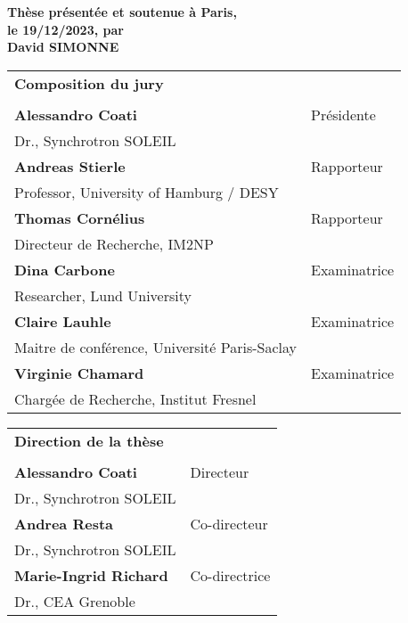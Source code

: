 \begin{titlepage}
\textbf{Thèse présentée et soutenue à Paris,\\ le 19/12/2023, par}\\
\bigskip
\Large {\color{Prune} \textbf{David SIMONNE}}

\vspace{\fill} %

\bigskip
\flushleft
\scriptsize
\begin{tabular}{|p{7cm}l}
\arrayrulecolor{Prune}
{\footnotesize \textbf{Composition du jury}}\\
& \\
\textbf{Alessandro Coati} & Présidente \\
Dr., Synchrotron SOLEIL & \\
\textbf{Andreas Stierle} & Rapporteur \\
Professor, University of Hamburg / DESY & \\
\textbf{Thomas Cornélius} & Rapporteur \\
Directeur de Recherche, IM2NP & \\
\textbf{Dina Carbone} & Examinatrice \\
Researcher, Lund University & \\
\textbf{Claire Lauhle} & Examinatrice \\
Maitre de conférence, Université Paris-Saclay & \\
\textbf{Virginie Chamard} & Examinatrice \\
Chargée de Recherche, Institut Fresnel & \\

\end{tabular} 

\medskip
\begin{tabular}{|p{7cm}l}
\arrayrulecolor{Prune}
{\footnotesize \textbf{Direction de la thèse}}\\
& \\
\textbf{Alessandro Coati} & Directeur \\
Dr., Synchrotron SOLEIL & \\
\textbf{Andrea Resta} & Co-directeur \\
Dr., Synchrotron SOLEIL & \\
\textbf{Marie-Ingrid Richard} & Co-directrice \\
Dr., CEA Grenoble & \\

\end{tabular} 

\end{titlepage}